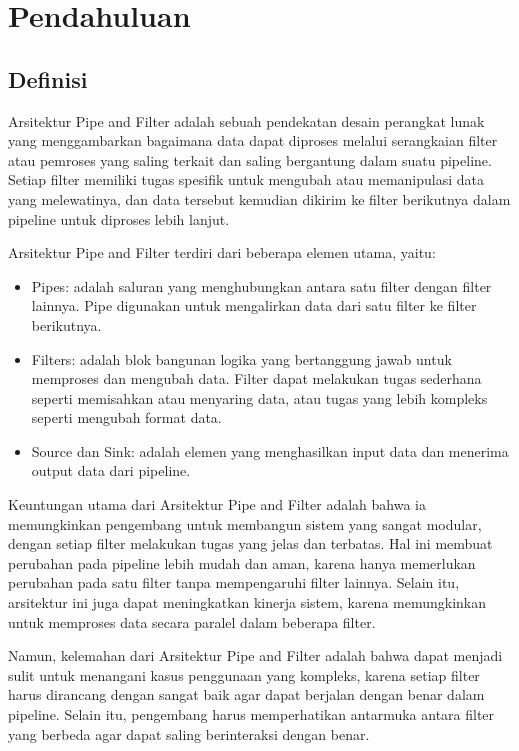 \chapter{Pendahuluan}



	\section{Definisi}
		Arsitektur Pipe and Filter adalah sebuah pendekatan desain perangkat lunak yang menggambarkan bagaimana data dapat diproses melalui serangkaian filter atau pemroses yang saling terkait dan saling bergantung dalam suatu pipeline. Setiap filter memiliki tugas spesifik untuk mengubah atau memanipulasi data yang melewatinya, dan data tersebut kemudian dikirim ke filter berikutnya dalam pipeline untuk diproses lebih lanjut.
	
	Arsitektur Pipe and Filter terdiri dari beberapa elemen utama, yaitu:
	\begin{itemize}
		\item Pipes: adalah saluran yang menghubungkan antara satu filter dengan filter lainnya. Pipe digunakan untuk mengalirkan data dari satu filter ke filter berikutnya.
		\item Filters: adalah blok bangunan logika yang bertanggung jawab untuk memproses dan mengubah data. Filter dapat melakukan tugas sederhana seperti memisahkan atau menyaring data, atau tugas yang lebih kompleks seperti mengubah format data.
		\item Source dan Sink: adalah elemen yang menghasilkan input data dan menerima output data dari pipeline.
	\end{itemize}
	
	Keuntungan utama dari Arsitektur Pipe and Filter adalah bahwa ia memungkinkan pengembang untuk membangun sistem yang sangat modular, dengan setiap filter melakukan tugas yang jelas dan terbatas. Hal ini membuat perubahan pada pipeline lebih mudah dan aman, karena hanya memerlukan perubahan pada satu filter tanpa mempengaruhi filter lainnya. Selain itu, arsitektur ini juga dapat meningkatkan kinerja sistem, karena memungkinkan untuk memproses data secara paralel dalam beberapa filter.
	
	Namun, kelemahan dari Arsitektur Pipe and Filter adalah bahwa dapat menjadi sulit untuk menangani kasus penggunaan yang kompleks, karena setiap filter harus dirancang dengan sangat baik agar dapat berjalan dengan benar dalam pipeline. Selain itu, pengembang harus memperhatikan antarmuka antara filter yang berbeda agar dapat saling berinteraksi dengan benar.
	

